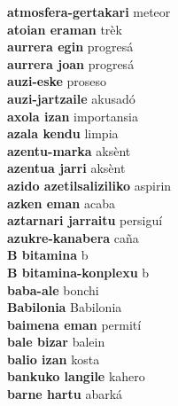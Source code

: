 \textbf{ atmosfera-gertakari  } meteor \\
\textbf{ atoian eraman  } trèk \\
\textbf{ aurrera egin  } progresá \\
\textbf{ aurrera joan  } progresá \\
\textbf{ auzi-eske  } proseso \\
\textbf{ auzi-jartzaile  } akusadó \\
\textbf{ axola izan  } importansia \\
\textbf{ azala kendu  } limpia \\
\textbf{ azentu-marka  } aksènt \\
\textbf{ azentua jarri  } aksènt \\
\textbf{ azido azetilsaliziliko  } aspirin \\
\textbf{ azken eman  } acaba \\
\textbf{ aztarnari jarraitu  } persiguí \\
\textbf{ azukre-kanabera  } caña \\
\textbf{ B bitamina  } b \\
\textbf{ B bitamina-konplexu  } b \\
\textbf{ baba-ale  } bonchi \\
\textbf{ Babilonia  } Babilonia \\
\textbf{ baimena eman  } permití \\
\textbf{ bale bizar  } balein \\
\textbf{ balio izan  } kosta \\
\textbf{ bankuko langile  } kahero \\
\textbf{ barne hartu  } abarká \\
